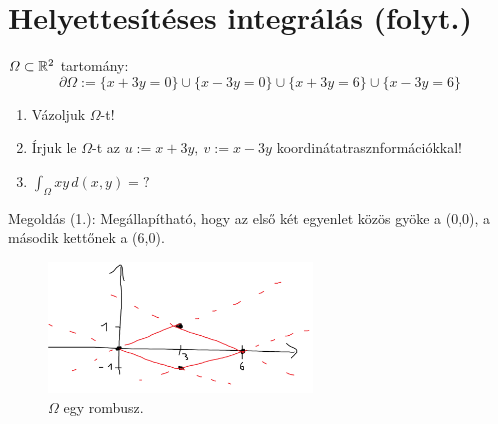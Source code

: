 \documentclass[a4paper,11.5pt]{article}
\begin{document}
	\section{Helyettesítéses integrálás (folyt.)}
	\begin{task}
		$ \varOmega\subset\mathbb{R}^2$ tartomány: $$\partial \varOmega:=\{x+3y=0\}\cup\{x-3y=0\}\cup\{x+3y=6\}\cup\{x-3y=6\}$$
		\begin{enumerate}
			\item Vázoljuk $ \varOmega$-t!
			\item Írjuk le $ \varOmega$-t az $u:=x+3y,\ v:=x-3y$ koordinátatrasznformációkkal!
			\item $\int_ \varOmega xy\,d(x,y)=?$
		\end{enumerate}
		
		Megoldás (1.): Megállapítható, hogy az első két egyenlet közös gyöke a (0,0), a második kettőnek a (6,0).
		\begin{figure}[h]
			\centering
			\includegraphics[width=7cm]{kepek/01.png}
			\caption{$\varOmega$ egy rombusz.}
		\end{figure}
		

\end{task}
\end{document}
